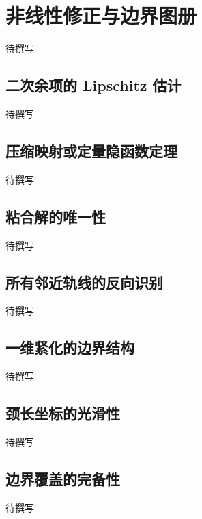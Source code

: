 
% 
% 
% 
% 
% 

\section{非线性修正与边界图册}
\label{g4:sec:2604}

待撰写

\subsection{二次余项的 Lipschitz 估计}
\label{g4:subsec:2604:01}
待撰写

\subsection{压缩映射或定量隐函数定理}
\label{g4:subsec:2604:02}
待撰写

\subsection{粘合解的唯一性}
\label{g4:subsec:2604:03}
待撰写

\subsection{所有邻近轨线的反向识别}
\label{g4:subsec:2604:04}
待撰写

\subsection{一维紧化的边界结构}
\label{g4:subsec:2604:05}
待撰写

\subsection{颈长坐标的光滑性}
\label{g4:subsec:2604:06}
待撰写

\subsection{边界覆盖的完备性}
\label{g4:subsec:2604:07}
待撰写
